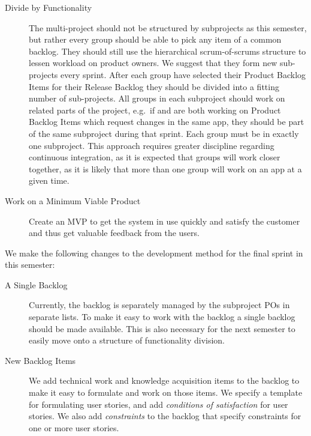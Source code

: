 \begin{description}
  \item[Divide by Functionality] The multi-project should not be structured by subprojects as this semester, but rather every group should be able to pick any item of a common backlog. They should still use the hierarchical scrum-of-scrums structure to lessen workload on product owners. We suggest that they form new sub-projects every sprint. After each group have selected their Product Backlog Items for their Release Backlog they should be divided into a fitting number of sub-projects. All groups in each subproject should work on related parts of the project, e.g.\ if  and  are both working on Product Backlog Items which request changes in the same app, they should be part of the same subproject during that sprint. Each group must be in exactly one subproject. This approach requires greater discipline regarding continuous integration, as it is expected that groups will work closer together, as it is likely that more than one group will work on an app at a given time. 
  \item[Work on a Minimum Viable Product] Create an MVP to get the system in use quickly and satisfy the customer and thus get valuable feedback from the users.
\end{description}

We make the following changes to the development method for the final sprint in this semester:

\begin{description}
  \item[A Single Backlog] Currently, the backlog is separately managed by the subproject POs in separate lists. To make it easy to work with the backlog a single backlog should be made available. This is also necessary for the next semester to easily move onto a structure of functionality division.
  \item[New Backlog Items] We add technical work and knowledge acquisition items to the backlog to make it easy to formulate and work on those items. We specify a template for formulating user stories, and add \emph{conditions of satisfaction} for user stories. We also add \emph{constraints} to the backlog that specify constraints for one or more user stories.
\end{description}

